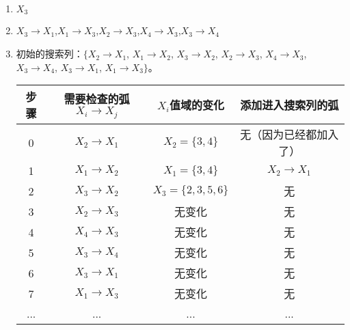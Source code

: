     \begin{solution}
        \begin{enumerate}
            \item $X_3$
            \item $X_3\rightarrow X_1$,$X_1\rightarrow X_3$,$X_2\rightarrow X_3$,$X_4\rightarrow X_3$,$X_3\rightarrow X_4$
            \item 
            \begin{center}
                初始的搜索列：$\{ X_2\rightarrow X_1$, $X_1\rightarrow X_2$, $X_3\rightarrow X_2$, $X_2\rightarrow X_3$, $X_4\rightarrow X_3$, $X_3\rightarrow X_4$, $X_3\rightarrow X_1$, $X_1\rightarrow X_3 \}$。\\
                \begin{tabular}{|c|c|c|c|}
                    \hline 
                     步骤& 需要检查的弧$X_i\rightarrow X_j$ & $X_i$值域的变化 & 添加进入搜索列的弧   \\
                     \hline 
                     0 & $X_2\rightarrow X_1$ & $X_2=\{3,4\}$  & 无（因为已经都加入了） \\ \hline
                     1 & $X_1\rightarrow X_2$ & $X_1=\{3,4\}$ & $X_2\rightarrow X_1$ \\ \hline
                     2 & $X_3\rightarrow X_2$ & $X_3=\{2,3,5,6\}$  & 无  \\ \hline
                     3 & $X_2\rightarrow X_3$ & 无变化 & 无 \\ \hline
                     4 & $X_4\rightarrow X_3$ &  无变化 & 无 \\ \hline
                     5 & $X_3\rightarrow X_4$ &  无变化 & 无 \\ \hline
                     6 & $X_3\rightarrow X_1$ &  无变化 & 无 \\ \hline
                     7 & $X_1\rightarrow X_3$ & 无变化  & 无 \\ \hline
                     ...& ... & ... & \qquad \qquad \qquad \quad ... \\ \hline
                \end{tabular}\\
                \end{center}
        \end{enumerate}
    \end{solution}

